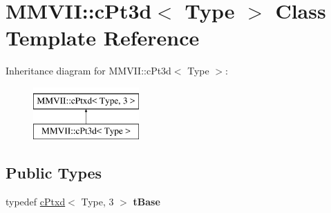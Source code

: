 \hypertarget{classMMVII_1_1cPt3d}{}\section{M\+M\+V\+II\+:\+:c\+Pt3d$<$ Type $>$ Class Template Reference}
\label{classMMVII_1_1cPt3d}
Inheritance diagram for M\+M\+V\+II\+:\+:c\+Pt3d$<$ Type $>$\+:\begin{figure}[H]
\begin{center}
\leavevmode
\includegraphics[height=2.000000cm]{classMMVII_1_1cPt3d}
\end{center}
\end{figure}
\subsection*{Public Types}
\begin{DoxyCompactItemize}
\item 
typedef \hyperlink{classMMVII_1_1cPtxd}{c\+Ptxd}$<$ Type, 3 $>$ {\bfseries t\+Base}\hypertarget{classMMVII_1_1cPt3d_ac0ff732405d3854615910fdbebe198c3}{}\label{classMMVII_1_1cPt3d_ac0ff732405d3854615910fdbebe198c3}

\end{DoxyCompactItemize}
